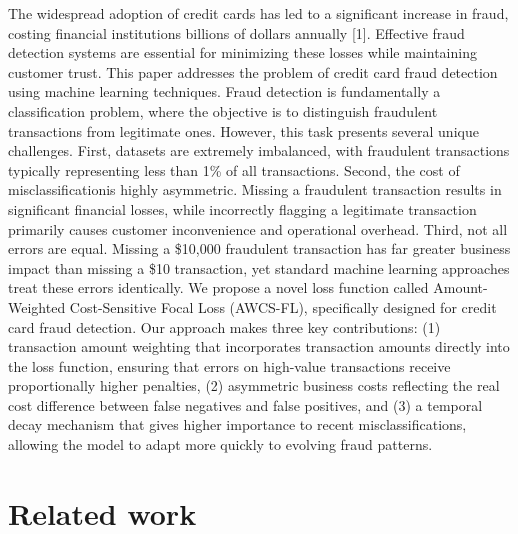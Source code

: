 \documentclass[10pt,twocolumn,letterpaper]{article}
\begin{document}
The widespread adoption of credit cards has led to a significant increase in fraud, costing financial institutions billions of dollars annually [1]. Effective fraud detection systems are essential for minimizing these losses while maintaining customer trust. This paper addresses the problem of credit card fraud detection using machine learning techniques.
Fraud detection is fundamentally a classification problem, where the objective is to distinguish fraudulent transactions from legitimate ones. However, this task presents several unique challenges. First, datasets are extremely imbalanced, with fraudulent transactions typically representing less than 1\% of all transactions. Second, the cost of misclassificationis 
highly asymmetric. Missing a fraudulent transaction results in significant financial losses, while incorrectly flagging a legitimate transaction primarily causes customer inconvenience and operational overhead. Third, not all errors are equal. Missing a \$10,000 fraudulent transaction has far greater business impact than missing a \$10 transaction, yet standard machine learning approaches treat these errors identically.
We propose a novel loss function called Amount-Weighted Cost-Sensitive Focal Loss (AWCS-FL), specifically designed for credit card fraud detection. Our approach makes three key contributions: (1) transaction amount weighting that incorporates transaction amounts directly into the loss function, ensuring that errors on high-value transactions receive proportionally higher penalties, (2) asymmetric business costs reflecting the real cost difference between false negatives and false positives, and (3) a temporal decay mechanism that gives higher importance to recent misclassifications, allowing the model to adapt more quickly to evolving fraud patterns.

\section{Related work}
\end{document}
